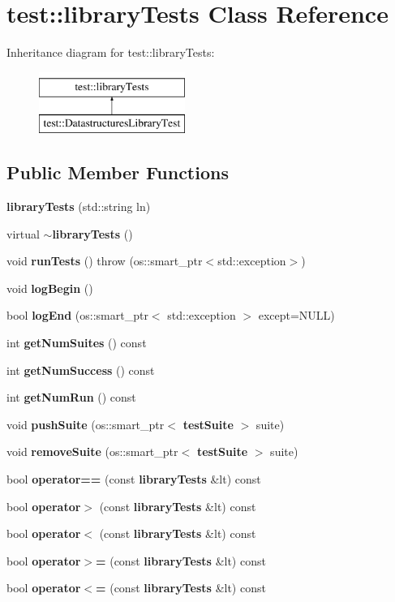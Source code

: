 \section{test\+:\+:library\+Tests Class Reference}
\label{classtest_1_1libraryTests}
Inheritance diagram for test\+:\+:library\+Tests\+:\begin{figure}[H]
\begin{center}
\leavevmode
\includegraphics[height=2.000000cm]{classtest_1_1libraryTests}
\end{center}
\end{figure}
\subsection*{Public Member Functions}
\begin{DoxyCompactItemize}
\item 
{\bf library\+Tests} (std\+::string ln)
\item 
virtual {\bf $\sim$library\+Tests} ()
\item 
void {\bf run\+Tests} ()  throw (os\+::smart\+\_\+ptr$<$std\+::exception$>$)
\item 
void {\bf log\+Begin} ()
\item 
bool {\bf log\+End} (os\+::smart\+\_\+ptr$<$ std\+::exception $>$ except=N\+U\+LL)
\item 
int {\bf get\+Num\+Suites} () const 
\item 
int {\bf get\+Num\+Success} () const 
\item 
int {\bf get\+Num\+Run} () const 
\item 
void {\bf push\+Suite} (os\+::smart\+\_\+ptr$<$ {\bf test\+Suite} $>$ suite)
\item 
void {\bf remove\+Suite} (os\+::smart\+\_\+ptr$<$ {\bf test\+Suite} $>$ suite)
\item 
bool {\bf operator==} (const {\bf library\+Tests} \&lt) const 
\item 
bool {\bf operator$>$} (const {\bf library\+Tests} \&lt) const 
\item 
bool {\bf operator$<$} (const {\bf library\+Tests} \&lt) const 
\item 
bool {\bf operator$>$=} (const {\bf library\+Tests} \&lt) const 
\item 
bool {\bf operator$<$=} (const {\bf library\+Tests} \&lt) const 
\end{DoxyCompactItemize}
